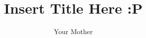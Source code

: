 \documentclass[11pt]{report}
\begin{document}
\title{Insert Title Here :P} 
\author{Your Mother}
\maketitle
\thispagestyle{empty}
\newpage


\newpage

\newpage

\newpage

\newpage

\newpage

\newpage



\end{document}
